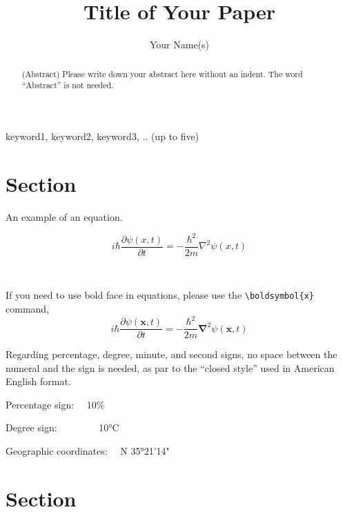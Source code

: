 \documentclass[authorproof,JACIII,researchpaper]{fujipressarticle}
\begin{document}
\pagestyle{fujipressstyle}

\title{Title of Your Paper}
\author{Your Name(s)}
\address{Your Institute(s)\\
	Address(es) of Your Institute\\
	E-mail: Your E-mail address(es)}
\maketitle


\begin{abstract}%
	\noindent (Abstract) Please write down your abstract here without an indent.  The word ``Abstract'' is not needed.  
\end{abstract}

\begin{keywords}
	keyword1, keyword2, keyword3, .. (up to five)
\end{keywords}


\section{Section}
An example of an equation.

\begin{equation}
	i \hbar \frac{\partial \psi (x,t)}{\partial  t} = -\frac{\hbar ^2}{2m}{\nabla}^2 \psi (x,t)
\end{equation}\par
~\par
If you need to use bold face in equations, please use the \verb|\boldsymbol{x}| command,
\begin{equation}
	i \hbar \frac{\partial \psi (\boldsymbol{x},t)}{\partial  t} = -\frac{\hbar ^2}{2m}\boldsymbol{{\nabla}}^2 \psi (\boldsymbol{x},t)
\end{equation}


Regarding percentage, degree, minute, and second signs, no space between the numeral and the sign is needed, as par to the “closed style” used in American English format.\par
  Percentage sign: ~~10\%\par
  Degree sign: ~~~~~~~~10°C\par
  Geographic coordinates: ~~N 35°21'14" \par


\section{Section}
\end{document}
